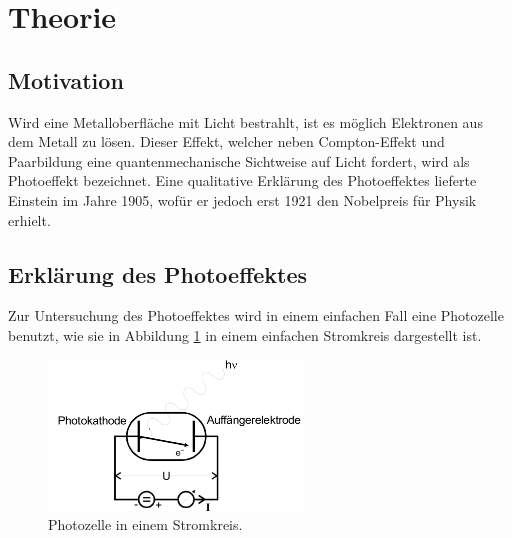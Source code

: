 \section{Theorie}
\label{sec:Theorie}

\subsection{Motivation}

Wird eine Metalloberfläche mit Licht bestrahlt, ist es möglich Elektronen aus dem Metall zu lösen.
Dieser Effekt, welcher neben Compton-Effekt und Paarbildung eine quantenmechanische Sichtweise auf Licht fordert, wird als Photoeffekt bezeichnet.
Eine qualitative Erklärung des Photoeffektes lieferte Einstein im Jahre 1905, wofür er jedoch erst 1921 den Nobelpreis für Physik erhielt. \cite{skript}

\subsection{Erklärung des Photoeffektes}
Zur Untersuchung des Photoeffektes wird in einem einfachen Fall eine Photozelle benutzt, wie sie in Abbildung \ref{abb:1} in einem einfachen Stromkreis dargestellt ist.

\begin{figure}[H]
  \centering
  \includegraphics[height=4cm]{ressources/aufbau.png}
  \caption{Photozelle in einem Stromkreis. \cite{skript}}
  \label{abb:1}
\end{figure}

